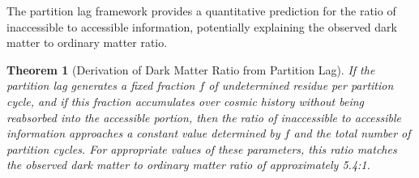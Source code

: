 \documentclass[12pt,a4paper]{article}
\newtheorem{theorem}{Theorem}[section]
\theoremstyle{definition}
\theoremstyle{remark}
\begin{document}
The partition lag framework provides a quantitative prediction for the ratio of inaccessible to accessible information, potentially explaining the observed dark matter to ordinary matter ratio.

\begin{theorem}[Derivation of Dark Matter Ratio from Partition Lag]
\label{thm:dark_matter_partition}
If the partition lag generates a fixed fraction $f$ of undetermined residue per partition cycle, and if this fraction accumulates over cosmic history without being reabsorbed into the accessible portion, then the ratio of inaccessible to accessible information approaches a constant value determined by $f$ and the total number of partition cycles. For appropriate values of these parameters, this ratio matches the observed dark matter to ordinary matter ratio of approximately 5.4:1.
\end{theorem}
\end{document}
